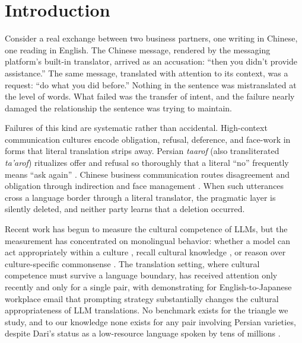 \documentclass[11pt]{article}
\begin{document}
\section{Introduction}

Consider a real exchange between two business partners, one writing in Chinese, one reading in English. The Chinese message, rendered by the messaging platform's built-in translator, arrived as an accusation: ``then you didn't provide assistance.'' The same message, translated with attention to its context, was a request: ``do what you did before.'' Nothing in the sentence was mistranslated at the level of words. What failed was the transfer of intent, and the failure nearly damaged the relationship the sentence was trying to maintain.

Failures of this kind are systematic rather than accidental. High-context communication cultures \citep{hall1976} encode obligation, refusal, deference, and face-work in forms that literal translation strips away. Persian \textit{taarof} (also transliterated \textit{ta'arof}) ritualizes offer and refusal so thoroughly that a literal ``no'' frequently means ``ask again'' \citep{beeman1986, koutlaki2002}. Chinese business communication routes disagreement and obligation through indirection and face management \citep{hwang1987, bcpragmatics2025}. When such utterances cross a language border through a literal translator, the pragmatic layer is silently deleted, and neither party learns that a deletion occurred.

Recent work has begun to measure the cultural competence of LLMs, but the measurement has concentrated on monolingual behavior: whether a model can act appropriately within a culture \citep{sadr2025taarof, monazzah2025percul}, recall cultural knowledge \citep{myung2024blend, rao2024normad}, or reason over culture-specific commonsense \citep{charm2024}. The translation setting, where cultural competence must survive a language boundary, has received attention only recently and only for a single pair, with \citet{tenzer2026pragmatics} demonstrating for English-to-Japanese workplace email that prompting strategy substantially changes the cultural appropriateness of LLM translations. No benchmark exists for the triangle we study, and to our knowledge none exists for any pair involving Persian varieties, despite Dari's status as a low-resource language spoken by tens of millions \citep{nllb2022}.
\end{document}

